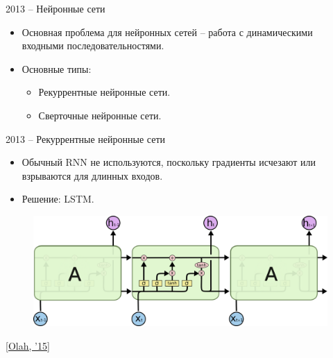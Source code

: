 \begin{frame}[c]{2013 -- Нейронные сети}
\begin{itemize}
	[square]
	\item Основная проблема для нейронных сетей -- работа с динамическими входными последовательностями. 
	\item Основные типы:
	\begin{itemize}
		[circle]
		\item Рекуррентные нейронные сети. 
		\item Сверточные нейронные сети.	
	\end{itemize}
\end{itemize}

\end{frame}


\begin{frame}[c]{2013 -- Рекуррентные нейронные сети}
\begin{itemize}
	[square]
	\item Обычный RNN не используются, поскольку градиенты исчезают или взрываются для длинных входов.
	\item Решение: LSTM.
\end{itemize}
\begin{figure}
	\centering
	\includegraphics[width=1.0\textwidth]{figures/lstm_colah_2015.png}
\end{figure}
\let\thefootnote\footnote{\href{http://colah.github.io/posts/2015-08-Understanding-LSTMs}{\color[rgb]{0.5,0.5,0.5} [Olah, ’15]}}
\end{frame}


